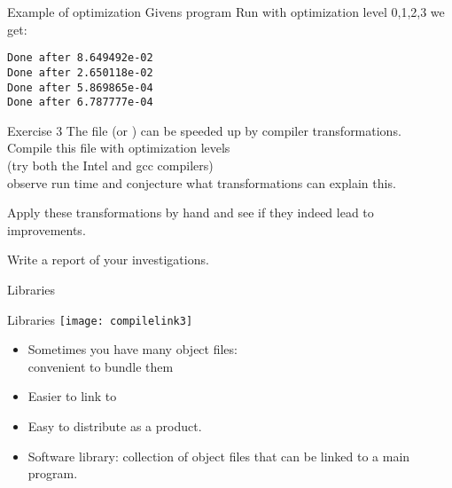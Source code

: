 \documentclass[11pt,headernav]{beamer}
\begin{document}
\begin{numberedframe}{Example of optimization}
  Givens program
Run with optimization level 0,1,2,3 we get:
\begin{verbatim}
Done after 8.649492e-02
Done after 2.650118e-02
Done after 5.869865e-04
Done after 6.787777e-04
\end{verbatim}
\end{numberedframe}

\begin{numberedframe}{Exercise 3}
  \label{sl:ex:rotate}
  The file  (or )
  can be speeded up by compiler transformations.\\
  Compile this file with optimization levels \\
  (try both the Intel and gcc compilers)\\
  observe run time and conjecture what transformations can explain this.
  
  Apply these transformations by hand and see if they indeed
  lead to improvements.
  
  Write a report of your investigations.
\end{numberedframe}

 {Libraries}

\begin{numberedframe}{Libraries}
  \label{sl-tut:}
  \texttt{[image: compilelink3]}
  \begin{itemize}
  \item Sometimes you have many object files:\\
    convenient to bundle them
  \item Easier to link to
  \item Easy to distribute as a product.
\item Software library: collection of object files that can be linked to a main program.
  \end{itemize}
\end{numberedframe}
\end{document}
